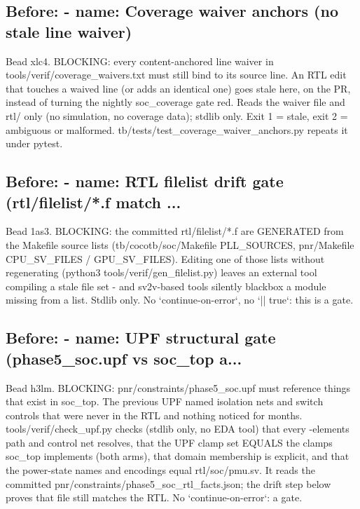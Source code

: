 \begin{record}
\subsection*{Before: - name: Coverage waiver anchors (no stale line waiver)}

\begin{textblock}
Bead xlc4. BLOCKING: every content-anchored line waiver in tools/verif/coverage_waivers.txt must
still bind to its source line. An RTL edit that touches a waived line (or adds an identical
one) goes stale here, on the PR, instead of turning the nightly soc_coverage gate red. Reads
the waiver file and rtl/ only (no simulation, no coverage data); stdlib only. Exit 1 = stale,
exit 2 = ambiguous or malformed. tb/tests/test_coverage_waiver_anchors.py repeats it under pytest.
\end{textblock}

\subsection*{Before: - name: RTL filelist drift gate (rtl/filelist/*.f match ...}

\begin{textblock}
Bead 1as3. BLOCKING: the committed rtl/filelist/*.f are GENERATED from the Makefile source
lists (tb/cocotb/soc/Makefile PLL_SOURCES, pnr/Makefile CPU_SV_FILES / GPU_SV_FILES). Editing
one of those lists without regenerating (python3 tools/verif/gen_filelist.py) leaves an
external tool compiling a stale file set - and sv2v-based tools silently blackbox a module
missing from a list. Stdlib only. No `continue-on-error`, no `|| true`: this is a gate.
\end{textblock}

\subsection*{Before: - name: UPF structural gate (phase5\_soc.upf vs soc\_top a...}

\begin{textblock}
Bead h3lm. BLOCKING: pnr/constraints/phase5_soc.upf must reference things that exist in soc_top.
The previous UPF named isolation nets and switch controls that were never in the RTL and nothing
noticed for months. tools/verif/check_upf.py checks (stdlib only, no EDA tool) that every
-elements path and control net resolves, that the UPF clamp set EQUALS the clamps soc_top
implements (both arms), that domain membership is explicit, and that the power-state names and
encodings equal rtl/soc/pmu.sv. It reads the committed pnr/constraints/phase5_soc_rtl_facts.json;
the drift step below proves that file still matches the RTL. No `continue-on-error`: a gate.
\end{textblock}


\end{record}
